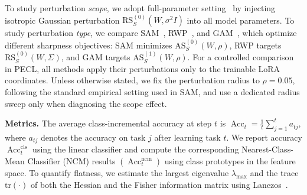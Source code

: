\documentclass{article}
\theoremstyle{plain}
\theoremstyle{definition}
\theoremstyle{remark}
\begin{document}
To study perturbation \emph{scope}, we adopt {full-parameter} setting~\cite{li2024flatlora} by injecting isotropic Gaussian perturbation $\mathrm{RS}_S^{(0)}({W}, \sigma^2 
I)$ into all model parameters.
To study perturbation \emph{type}, we compare SAM~\cite{foretSharpnessAwareMinimizationEfficiently2021}, RWP~\cite{pmlr-v151-bisla22a}, and GAM~\cite{Zhang_GAM}, which optimize different sharpness objectives: SAM minimizes $\mathrm{AS}^{(0)}_S(W,\rho)$, RWP targets $\mathrm{RS}^{(0)}_S(W,\Sigma)$, and GAM targets $\mathrm{AS}^{(1)}_S(W,\rho)$. For a controlled comparison in PECL, all methods apply their perturbations only to the trainable LoRA coordinates.
Unless otherwise stated, we fix the perturbation radius to $\rho=0.05$, following the standard empirical setting used in SAM, and use a dedicated radius sweep only when diagnosing the scope effect.




\noindent\textbf{Metrics.}\quad
The average class-incremental accuracy at step $t$ is
$
\operatorname{Acc}_t = \frac{1}{t} \sum_{j=1}^{t} a_{tj}
$,  where $a_{tj}$ denotes the accuracy on task $j$ after learning task $t$. 
We report accuracy $\operatorname{Acc}_t^{\mathrm{cls}}$ using the linear classifier and
compute the corresponding Nearest-Class-Mean Classifier (NCM) results
$(\operatorname{Acc}_t^{\mathrm{ncm}})$ using class prototypes in the feature space.
To quantify flatness, we estimate the largest eigenvalue $\lambda_{\max}$ and the trace $\mathrm{tr}(\cdot)$ of both the Hessian and the Fisher information matrix using Lanczos~\cite{ghorbaniInvestigationNeuralNet2019}.
\end{document}
